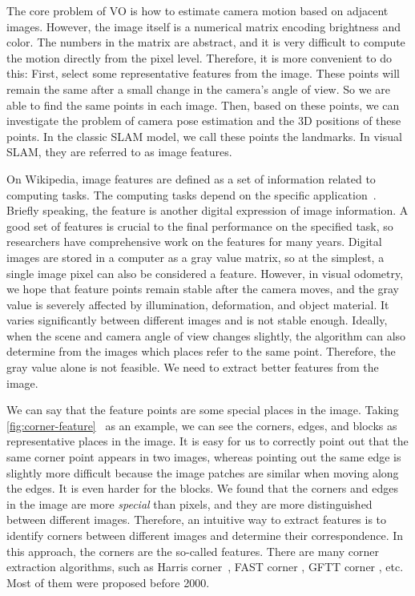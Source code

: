 The core problem of VO is how to estimate camera motion based on adjacent images. However, the image itself is a numerical matrix encoding brightness and color. The numbers in the matrix are abstract, and it is very difficult to compute the motion directly from the pixel level. Therefore, it is more convenient to do this: First, select some representative features from the image. These points will remain the same after a small change in the camera's angle of view. So we are able to find the same points in each image. Then, based on these points, we can investigate the problem of camera pose estimation and the 3D positions of these points. In the classic SLAM model, we call these points the landmarks. In visual SLAM, they are referred to as image features.

On Wikipedia, image features are defined as a set of information related to computing tasks. The computing tasks depend on the specific application~\cite{wiki:featurecv}. Briefly speaking, the feature is another digital expression of image information. A good set of features is crucial to the final performance on the specified task, so researchers have comprehensive work on the features for many years. Digital images are stored in a computer as a gray value matrix, so at the simplest, a single image pixel can also be considered a feature. However, in visual odometry, we hope that feature points remain stable after the camera moves, and the gray value is severely affected by illumination, deformation, and object material. It varies significantly between different images and is not stable enough. Ideally, when the scene and camera angle of view changes slightly, the algorithm can also determine from the images which places refer to the same point. Therefore, the gray value alone is not feasible. We need to extract better features from the image.

We can say that the feature points are some special places in the image. Taking \autoref{fig:corner-feature}~ as an example, we can see the corners, edges, and blocks as representative places in the image. It is easy for us to correctly point out that the same corner point appears in two images, whereas pointing out the same edge is slightly more difficult because the image patches are similar when moving along the edges. It is even harder for the blocks. We found that the corners and edges in the image are more \textit{special} than pixels, and they are more distinguished between different images. Therefore, an intuitive way to extract features is to identify corners between different images and determine their correspondence. In this approach, the corners are the so-called features. There are many corner extraction algorithms, such as Harris corner~\cite{Harris1988}, FAST corner {\cite{Rosten2006}}, GFTT corner  {\cite{Shi1994}}, etc. Most of them were proposed before 2000.

